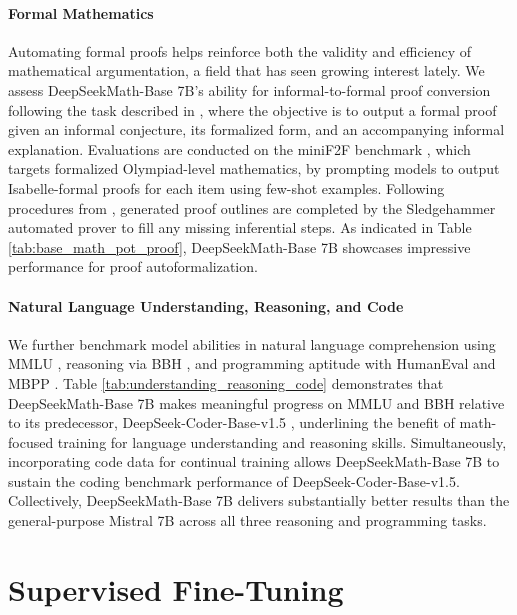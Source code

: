 \paragraph{Formal Mathematics}

Automating formal proofs helps reinforce both the validity and efficiency of mathematical argumentation, a field that has seen growing interest lately. We assess DeepSeekMath-Base 7B's ability for informal-to-formal proof conversion following the task described in \citep{dsp_proof}, where the objective is to output a formal proof given an informal conjecture, its formalized form, and an accompanying informal explanation. Evaluations are conducted on the miniF2F benchmark \citep{minif2f}, which targets formalized Olympiad-level mathematics, by prompting models to output Isabelle-formal proofs for each item using few-shot examples. Following procedures from \cite{dsp_proof}, generated proof outlines are completed by the Sledgehammer automated prover \citep{sledgehammer} to fill any missing inferential steps. As indicated in Table \ref{tab:base_math_pot_proof}, DeepSeekMath-Base 7B showcases impressive performance for proof autoformalization.

\paragraph{Natural Language Understanding, Reasoning, and Code}

We further benchmark model abilities in natural language comprehension using MMLU \citep{mmlu}, reasoning via BBH \citep{bbh}, and programming aptitude with HumanEval \citep{codex} and MBPP \citep{mbpp}. Table \ref{tab:understanding_reasoning_code} demonstrates that DeepSeekMath-Base 7B makes meaningful progress on MMLU and BBH relative to its predecessor, DeepSeek-Coder-Base-v1.5 \citep{deepseek-coder}, underlining the benefit of math-focused training for language understanding and reasoning skills. Simultaneously, incorporating code data for continual training allows DeepSeekMath-Base 7B to sustain the coding benchmark performance of DeepSeek-Coder-Base-v1.5. Collectively, DeepSeekMath-Base 7B delivers substantially better results than the general-purpose Mistral 7B \citep{mistral} across all three reasoning and programming tasks.

\section{Supervised Fine-Tuning}


